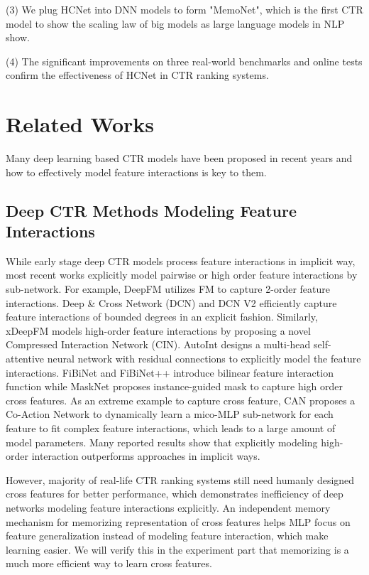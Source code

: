 \documentclass[sigconf,authorversion]{acmart}
\begin{document}
(3) We plug HCNet into DNN models to form "MemoNet", which is the first CTR model to show the scaling law of big models as large language models in NLP show.

(4) The significant improvements on three real-world benchmarks and online tests confirm the effectiveness of HCNet in CTR ranking systems.
\section{Related Works}
Many deep learning based CTR models\cite{guo2017deepfm, wang2017deep, WangSCJLHC21,song2019autoint,HuangZZ19,lian2018xdeepfm,masknet} have been proposed in recent years and how to effectively model feature interactions is key to them.
\subsection{Deep CTR Methods Modeling Feature Interactions}
While early stage deep CTR models process feature interactions in implicit way\cite{zhang2016deep, xiao2017attentional, nfm}, most recent works explicitly model pairwise or high order feature interactions by sub-network\cite{guo2017deepfm, lian2018xdeepfm, wang2017deep,WangSCJLHC21,HuangZZ19,song2019autoint,zhou2020can}. For example, DeepFM\cite{guo2017deepfm} utilizes FM to capture 2-order feature interactions. Deep \& Cross Network (DCN)\cite{wang2017deep} and DCN V2 \cite{WangSCJLHC21} efficiently capture feature interactions of bounded degrees in an explicit fashion. Similarly, xDeepFM \cite{lian2018xdeepfm} models high-order feature interactions by proposing a novel Compressed Interaction Network (CIN). AutoInt\cite{song2019autoint} designs a multi-head self-attentive neural network with residual connections to explicitly model the feature interactions. FiBiNet \cite{HuangZZ19} and FiBiNet++\cite{fibnetjia} introduce bilinear feature interaction function while MaskNet \cite{masknet} proposes instance-guided mask to capture high order cross features. As an extreme example to capture cross feature, CAN \cite{zhou2020can} proposes a Co-Action Network to dynamically learn a mico-MLP sub-network for each feature to fit complex feature interactions, which leads to a large amount of model parameters. Many reported results \cite{lian2018xdeepfm,wang2017deep,WangSCJLHC21,HuangZZ19} show that explicitly modeling high-order interaction  outperforms approaches in implicit ways. 

However, majority of real-life CTR ranking systems still need  humanly designed cross features for better performance, which demonstrates inefficiency of deep networks modeling feature interactions explicitly. An independent memory mechanism for memorizing representation of cross features helps MLP focus on feature generalization instead of modeling feature interaction, which make learning easier. We will verify this in the experiment part that memorizing is a much more efficient way to learn cross features.
\end{document}
